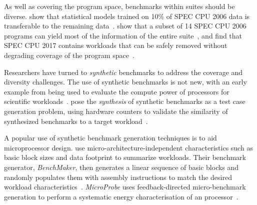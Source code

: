 As well as covering the program space, benchmarks within suites should be diverse.
\citeauthor{Ould-Ahmed-Vall2008} show that statistical models trained on 10\% of SPEC CPU 2006 data is transferable to the remaining data~\cite{Ould-Ahmed-Vall2008}.
\citeauthor{Phansalkar2007} show that a subset of 14 SPEC CPU 2006 programs can yield most of the information of the entire suite~\cite{Phansalkar2007}, and
\citeauthor{Draft2018} find that SPEC CPU 2017 contains workloads that can be safely removed without degrading coverage of the program space~\cite{Draft2018}.

Researchers have turned to \emph{synthetic} benchmarks to address the coverage and diversity challenges.
The use of synthetic benchmarks is not new, with an early example from \citeyear{Curnow1976} being used to evaluate the compute power of processors for scientific workloads~\cite{Curnow1976}.
\citeauthor{Bell2005} pose the \emph{synthesis} of synthetic benchmarks as a test case generation problem, using hardware counters to validate the similarity of synthesized benchmarks to a target workload~\cite{Bell2005}.

A popular use of synthetic benchmark generation techniques is to aid microprocessor design. \citeauthor{Joshi2008} use micro-architecture-independent characteristics such as basic block sizes and data footprint to summarize workloads. Their benchmark generator, \emph{BenchMaker}, then generates a linear sequence of basic blocks and randomly populates them with assembly instructions to match the desired workload characteristics~\cite{Joshi2008}.
\emph{MicroProbe} uses feedback-directed micro-benchmark generation to perform a systematic energy characterisation of an processor~\cite{Bertran2012}.

